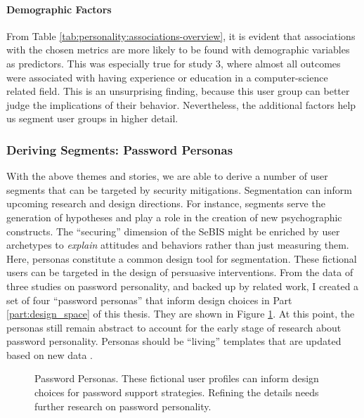 \paragraph{Demographic Factors}
From Table \ref{tab:personality:associations-overview}, it is evident that associations with the chosen metrics are more likely to be found with demographic variables as predictors. This was especially true for study 3, where almost all outcomes were associated with having experience or education in a computer-science related field. This is an unsurprising finding, because this user group can better judge the implications of their behavior. Nevertheless, the additional factors help us segment user groups in higher detail. 

\subsubsection{Deriving Segments: Password Personas}\label{sec:personality:personas}
With the above themes and stories, we are able to derive a number of user segments that can be targeted by security mitigations. Segmentation can inform upcoming research and design directions. For instance, segments serve the generation of hypotheses and play a role in the creation of new psychographic constructs. The ``securing'' dimension of the \gls{SeBIS} might be enriched by user archetypes to \textit{explain} attitudes and behaviors rather than just measuring them. Here, \glspl{persona} constitute a common design tool for segmentation. These fictional users can be targeted in the design of persuasive interventions. From the data of three studies on password personality, and backed up by related work, I created a set of four ``password personas'' that inform design choices in Part \ref{part:design_space} of this thesis. They are shown in Figure \ref{fig:personality:personas}. At this point, the personas still remain abstract to account for the early stage of research about password personality. Personas should be ``living'' templates that are updated based on new data \cite{Gothelf2013LeanUX}. 

\begin{figure}
	\centering
	\caption{\label{fig:personality:personas} Password Personas. These fictional user profiles can inform design choices for password support strategies. Refining the details needs further research on password personality.}
\end{figure}

